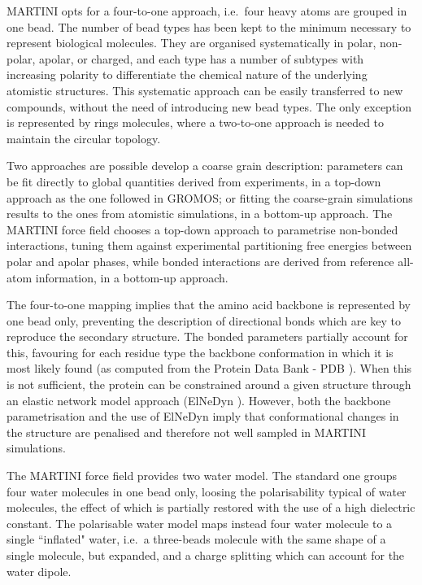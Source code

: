 \documentclass[graybox]{svmult}
\begin{document}
MARTINI opts for a four-to-one approach, i.e.\ four heavy atoms are grouped in one bead. The number of bead types has been kept to the minimum necessary to represent biological molecules. They are organised systematically in polar, non-polar, apolar, or charged, and each type has a number of subtypes with increasing polarity to differentiate the chemical nature of the underlying atomistic structures.
%
This systematic approach can be easily transferred to new compounds, without the need of introducing new bead types.
%
The only exception is represented by rings molecules, where a two-to-one approach is needed to maintain the circular topology.

Two approaches are possible develop a coarse grain description: parameters can be fit directly to global quantities derived from experiments, in a top-down approach as the one followed in GROMOS; or fitting the coarse-grain simulations results to the ones from atomistic simulations, in a bottom-up approach.
%
The MARTINI force field chooses a top-down approach to parametrise non-bonded interactions, tuning them against experimental partitioning free energies between polar and apolar phases, while bonded interactions are derived from reference all-atom information, in a bottom-up approach.

The four-to-one mapping implies that the amino acid backbone is represented by one bead only, preventing the description of directional bonds which are key to reproduce the secondary structure. The bonded parameters partially account for this, favouring for each residue type the backbone conformation in which it is most likely found (as computed from the Protein Data Bank - PDB \cite{PDB}). When this is not sufficient, the protein can be constrained around a given structure through an elastic network model approach (ElNeDyn \cite{Periole2009}). However, both the backbone parametrisation and the use of ElNeDyn imply that conformational changes in the structure are penalised and therefore not well sampled in MARTINI simulations.

The MARTINI force field provides two water model. The standard one groups four water molecules in one bead only, loosing the polarisability typical of water molecules, the effect of which is partially restored with the use of a high dielectric constant. The polarisable water model \cite{Yesylevskyy2010} maps instead four water molecule to a single ``inflated" water, i.e.\ a three-beads molecule with the same shape of a single molecule, but expanded, and a charge splitting which can account for the water dipole.
\end{document}
